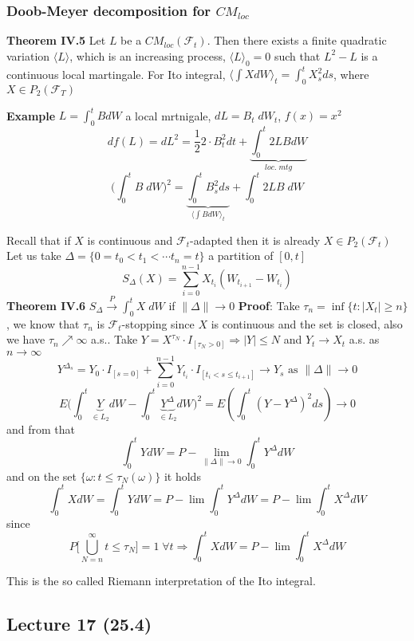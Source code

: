 \documentclass[english]{article}
\newcommand{\ub}{\underbrace}
\newcommand{\note}[1]{\noindent\textbf{#1}}
\newcommand{\F}{\mathcal F}
\begin{document}
\subsubsection*{Doob-Meyer decomposition for $CM_{loc}$}
\note{Theorem IV.5} Let $L$ be a $CM_{loc}(\F_t)$. Then there exists a finite quadratic variation $\langle L\rangle$, which is an increasing process, $\langle L\rangle_0 = 0$ such that $L^2 - L$ is a continuous local martingale. \newline
For Ito integral, $\big\langle \int X dW \big\rangle_t = \int^t_0 X^2_s ds$, where $X \in P_2(\F_T)$ \newline

\note{Example} $L = \int^t_0 B dW$ a local mrtnigale, $dL = B_t \; dW_t$, $f(x) = x^2$
$$df(L) = dL^2 = \frac 12 2 \cdot B^2_t dt + \ub{\int^t_0 2 LB dW}_{loc.\; mtg}$$
$$\Big(\int^t_0 B \; dW\Big)^2 = \ub{\int^t_0 B^2_s ds}_{\langle \int B dW \rangle_t} + \int^t_0 2LB \; dW$$ 

Recall that if $X$ is continuous and $\F_t$-adapted then it is already $X\in P_2(\F_t)$ Let us take $\Delta = \{0 = t_0 < t_1 < \cdots t_n = t\}$ a partition of $[0,t]$
$$S_\Delta(X) = \sum^{n-1}_{i=0} X_{t_i} (W_{t_{i+1}} - W_{t_i}) $$
\note{Theorem IV.6} $S_\Delta \stackrel P\to \int^t_0 X\; dW$ if $\|\Delta\| \to 0$ \newline
\note{Proof}: Take $\tau_n = \inf \{ t : |X_t| \geq n \}$, we know that $\tau_n$ is $\F_t$-stopping since $X$ is continuous and the set is closed, also we have $\tau_n \nearrow \infty$ a.s.. \newline
Take $Y = X^{\tau_N} \cdot I_{[\tau_N > 0]} \Rightarrow |Y|\leq N$ and $Y_t \to X_t$ a.s. as $n\to\infty$
$$Y^{\Delta_s} = Y_0 \cdot I_{[s =0]} + \sum^{n-1}_{i=0} Y_{t_i} \cdot I_{[t_i < s \leq t_{i+1}]} \to Y_s \text{ as } \|\Delta\|\to 0$$
$$E\Big(\int^t_0 \ub{Y}_{\in L_2} dW - \int^t_0 \ub{Y^\Delta}_{\in L_2} dW\Big)^2 = E(\int^t_0 (Y- Y^\Delta)^2 ds) \to 0$$
and from that 
$$\int^t_0 Y dW = P-\lim_{\|\Delta\|\to 0} \int^t_0 Y^\Delta dW$$
and on the set $\{\omega: t \leq \tau_N(\omega)\}$ it holds
$$\int^t_0 X dW = \int^t_0 Y dW = P-\lim \int^t_0 Y^\Delta dW = P-\lim \int^t_0 X^\Delta dW$$
since $$P\Big[\bigcup^\infty_{N=n} t \leq \tau_N \Big] = 1 \; \forall t \Rightarrow \int^t_0 X dW = P-\lim \int^t_0 X^\Delta dW$$

This is the so called Riemann interpretation of the Ito integral.

\subsection*{Lecture 17 (25.4)}
\end{document}

